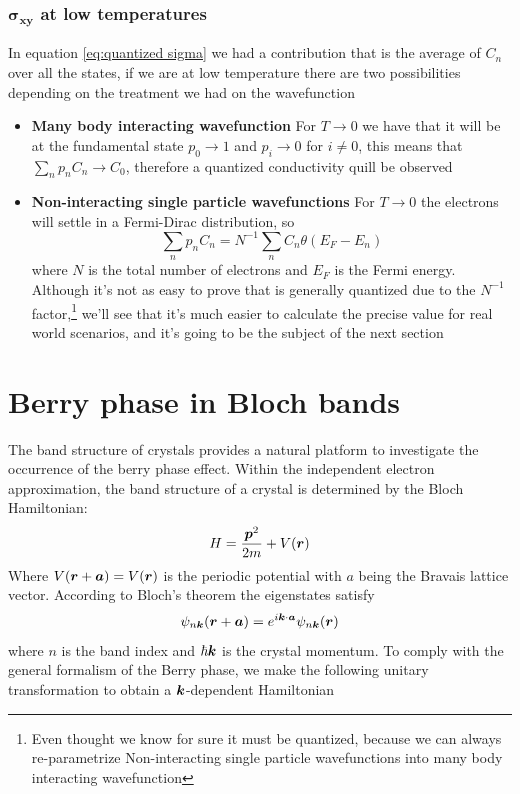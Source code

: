 \subsubsection*{$\boldsymbol{\sigma_{xy}}$ at low temperatures}
In equation \ref{eq:quantized sigma} we had a contribution that is the average of $C_n$ over all the states, if we are at low temperature there are two possibilities depending on the treatment we had on the wavefunction
\begin{itemize}
    \item \textbf{Many body interacting wavefunction} For $T\to 0$ we have that it will be at the fundamental state $p_0\to1$ and $p_i\to 0$ for $i\neq 0$, this means that $\sum_np_nC_n\to C_0$, therefore a quantized conductivity quill be observed
    \item \textbf{Non-interacting single particle wavefunctions} For $T\to 0$ the electrons will settle in a Fermi-Dirac distribution, so \[\sum_np_nC_n=N^{-1}\sum_nC_n\theta(E_F-E_n)\] where $N$ is the total number of electrons and $E_F$ is the Fermi energy. Although it's not as easy to prove that is generally quantized due to the $N^{-1}$ factor,\footnote{Even thought we know for sure it must be quantized, because we can always re-parametrize Non-interacting single particle wavefunctions into many body interacting wavefunction} we'll see that it's much easier to calculate the precise value for real world scenarios, and it's going to be the subject of the next section
\end{itemize}



















\section{Berry phase in Bloch bands}
\label{sec:berrybloch}
The band structure of crystals provides a natural platform to investigate the occurrence of the berry phase effect. Within the independent electron approximation, the band structure of a crystal is determined by the Bloch Hamiltonian:
\begin{equation}
    H= \frac {\boldsymbol{p}^2}{2m} + V(\boldsymbol{r})
\end{equation}
Where $V(\boldsymbol{r}+\boldsymbol{a})=V(\boldsymbol{r})$ is the periodic potential with $a$ being the Bravais lattice vector. According to Bloch's theorem the eigenstates satisfy 
\begin{equation}
    \psi_{n\boldsymbol{k}}(\boldsymbol{r}+\boldsymbol{a})=e^{i\boldsymbol{k}\cdot \boldsymbol{a}}\psi_{n\boldsymbol{k}}(\boldsymbol{r})
\end{equation}
where $n$ is the band index and $\hbar \boldsymbol{k}$ is the crystal momentum. To comply with the general formalism of the Berry phase, we make the following unitary transformation to obtain a $\boldsymbol{k}$-dependent Hamiltonian


